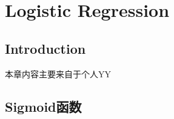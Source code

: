 \chapter{Logistic Regression}

\section*{Introduction}
	本章内容主要来自于个人YY

\section{Sigmoid函数}
	\boldmath  %
	













